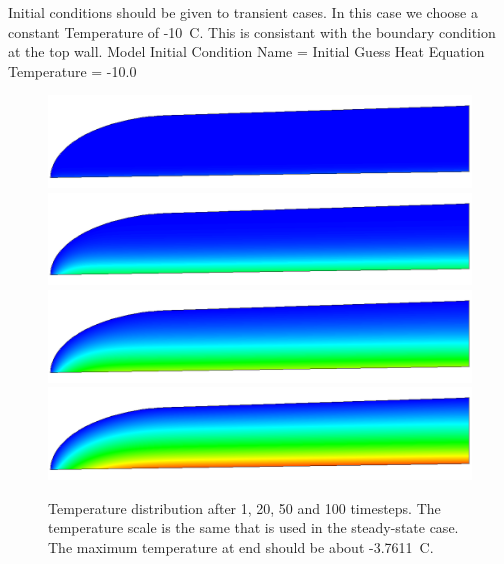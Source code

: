 Initial conditions should be given to transient cases. In this case we choose a constant Temperature 
of -10~C. This is consistant with the boundary condition at the top wall.
\ttbegin
Model
  Initial Condition 
    Name = Initial Guess
    Heat Equation
      Temperature = -10.0
\ttend

\begin{figure}
\begin{center}
\includegraphics[width=120mm]{glacier_t1}
\includegraphics[width=120mm]{glacier_t20}
\includegraphics[width=120mm]{glacier_t50}
\includegraphics[width=120mm]{glacier_t100}
\caption{Temperature distribution after 1, 20, 50 and 100 timesteps. The temperature scale is the 
same that is used in the steady-state case. The maximum temperature at end should be about -3.7611~C.}
\end{center}
\end{figure}

\hfill
\mbox{}






